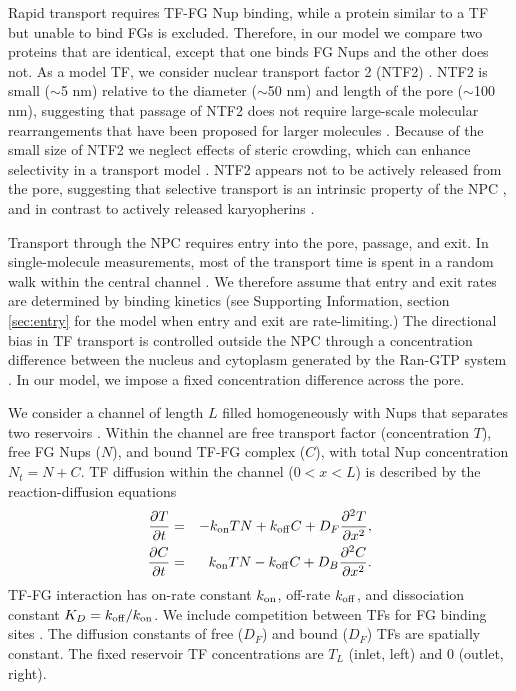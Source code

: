 Rapid transport requires TF-FG Nup binding, while a protein similar to
a TF but unable to bind FGs is excluded. Therefore, in our model we
compare two proteins that are identical, except that one binds FG Nups
and the other does not.  As a model TF, we consider nuclear transport
factor 2 (NTF2) \cite{ribbeck98}. NTF2 is small ($\sim$5 nm) relative
to the diameter ($\sim$50 nm) and length of the pore ($\sim$100 nm),
suggesting that passage of NTF2 does not require large-scale molecular
rearrangements that have been proposed for larger molecules
\cite{lowe15, frenkiel-krispin10}. Because of the small size of NTF2 we
neglect effects of steric crowding, which can enhance selectivity in a
transport model \cite{zilman07}.  NTF2 appears not to be actively
released from the pore, suggesting that selective transport is an
intrinsic property of the NPC \cite{mincer11, zilman07}, and in
contrast to actively released karyopherins \cite{lowe15, mincer11,
  gorlich96, gilchrist02}.

Transport through the NPC requires entry into the pore, passage, and
exit. In single-molecule measurements, most of the transport time is
spent in a random walk within the central channel \cite{yang04,
  tu13}. We therefore assume that entry and exit rates are determined
by binding kinetics (see Supporting Information, section
\ref{sec:entry} for the model when entry and exit are rate-limiting.)
The directional bias in TF transport is controlled outside the NPC
through a concentration difference between the nucleus and cytoplasm
generated by the Ran-GTP system \cite{riddick05}.  In our model, we
impose a fixed concentration difference across the pore.

We consider a channel of length $L$ filled homogeneously with Nups
that separates two reservoirs .  Within the
channel are free transport factor (concentration $T$), free FG Nups
($N$), and bound TF-FG complex ($C$), with total Nup concentration
$N_t= N+C$.  TF diffusion within the channel ($0<x<L$) is described by
the reaction-diffusion equations
\begin{eqnarray}
  \frac{\partial T}{\partial t} &=& -k_{\rm on} T N+k_{\rm off} C +D_F
       \frac{\partial^2 T}{\partial x^2},\label{eq:continuum_main} 
   \\ 
  \frac{\partial C}{\partial t} &=& k_{\rm on} T N -k_{\rm off} C + 
        D_B \frac{\partial^2 C}{\partial x^2} .
\label{eq:continuum_main_2} 
\end{eqnarray}
TF-FG interaction has on-rate constant $k_{\rm on}$, off-rate $k_{\rm off}$, and
dissociation constant $K_D =k_{\rm off}/k_{\rm on}$.  We include competition
between TFs for FG binding sites \cite{timney16}.  The
diffusion constants of free ($D_F$) and bound ($D_F$) TFs are
spatially constant. The fixed reservoir TF concentrations are $T_L$
(inlet, left) and 0 (outlet, right).

